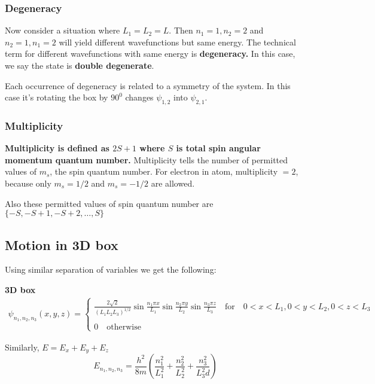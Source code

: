 \documentclass[11pt]{article}
\theoremstyle{definition}
\begin{document}
\subsubsection{Degeneracy}

Now consider a situation where $L_1 = L_2 = L$. Then $n_1 = 1, n_2 = 2$ and $n_2 = 1, n_1 = 2$ will yield different wavefunctions but same energy. The technical term for different wavefunctions with same energy is \textbf{degeneracy.} In this case, we say the state is \textbf{double degenerate}. 

Each occurrence of degeneracy is related to a symmetry of the system. In this case it's rotating the box by $90^0$ changes $\psi_{1,2}$ into $\psi_{2,1}$.

\subsubsection{Multiplicity}
\textbf{Multiplicity is defined as $2S+1$ where $S$ is total spin angular momentum quantum number.} Multiplicity tells the number of permitted values of $m_s$, the spin quantum number. For electron in atom, multiplicity $= 2$, because only $m_s = 1/2$ and $m_s = -1/2$ are allowed.

Also these permitted values of spin quantum number are $\{-S, -S+1, -S+2 ,\dots , S \}$
\subsection{Motion in 3D box}

Using similar separation of variables we get the following:
\begin{shaded}
\textbf{3D box}
\begin{gather*}
    \psi_{n_1, n_2, n_3}(x,y,z) = \begin{cases}
    \frac{2\sqrt{2}}{(L_1 L_2 L_3)^{1/2}} \sin{\frac{n_1 \pi x}{L_1}} \sin{\frac{n_2 \pi y}{L_2}} \sin{\frac{n_3 \pi z}{L_3}} \quad \text{for} \quad 0<x<L_1, 0<y<L_2, 0<z<L_3\\
    \\
    0 \quad \text{otherwise}
    \end{cases}
\end{gather*}

Similarly, $E = E_x + E_y + E_z$
\begin{equation*}
    E_{n_1, n_2,n_3} = \frac{h^2}{8m} \left(\frac{n_1^2}{L_1^2} + \frac{n_2^2}{L_2^2} + \frac{n_3^2}{L_3^2d}\right)
\end{equation*}
\end{shaded}
\end{document}
